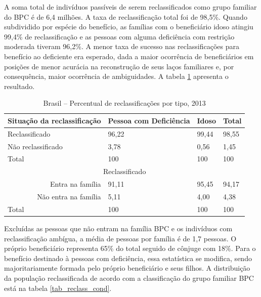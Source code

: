 \documentclass[
	12pt,				%
	openright,			%
	twoside,			%
	a4paper,			%
	english,			%
	french,				%
	spanish,			%
	brazil				%
	]{abntex2}
\begin{document}
A soma total de indivíduos passíveis de serem reclassificados como grupo familiar do BPC é de 6,4 milhões. A taxa de reclassificação total foi de 98,5\%. Quando subdividido por espécie do benefício, as famílias com o beneficiário idoso atingiu 99,4\% de reclassificação e as pessoas com alguma deficiência com restrição moderada tiveram 96,2\%. A menor taxa de sucesso nas reclassificações para benefício ao deficiente era esperado, dada a maior ocorrência de beneficiários em posições de menor acurácia na reconstrução de seus laços familiares e, por consequência, maior ocorrência de ambiguidades. A tabela \ref*{tab_per_reclas} apresenta o resultado. 

\begin{table}[H]
	\footnotesize
	\centering
	\caption{Brasil -- Percentual de reclassificações por tipo, 2013}
	\label{tab_per_reclas}
	\begin{tabular}{@{}p{4.5cm}p{4cm}p{3cm}p{3cm}@{}}
		\toprule
		\textbf{Situação da reclassificação}     & \textbf{Pessoa com Deficiência} & \textbf{Idoso} & \textbf{Total} \\ \midrule
		Reclassificado                           & 96,22                  & 99,44 & 98,55 \\                 
		Não reclassificado                       & 3,78                   & 0,56  & 1,45  \\ \midrule
		Total                                    & 100                    & 100   & 100   \\ \midrule
		\multicolumn{4}{c}{Reclassificado} \\ \midrule
		\multicolumn{1}{r}{Entra na família}     & 91,11                  & 95,45 & 94,17 \\               
		\multicolumn{1}{r}{Não entra na família} & 5,11                   & 4,00  & 4,38  \\ \midrule  
		Total                                    & 100                    & 100   & 100   \\ \bottomrule    
	\end{tabular}
\end{table}

Excluídas as pessoas que não entram na família BPC e os indivíduos com reclassificação ambígua, a média de pessoas por família é de 1,7 pessoas. O próprio beneficiário representa 65\% do total seguido de cônjuge com 18\%. Para o benefício destinado à pessoas com deficiência, essa estatística se modifica, sendo majoritariamente formada pelo próprio beneficiário e seus filhos. A distribuição da população reclassificada de acordo com a classificação do grupo familiar BPC está na tabela \ref*{tab_reclass_cond}.
\end{document}
